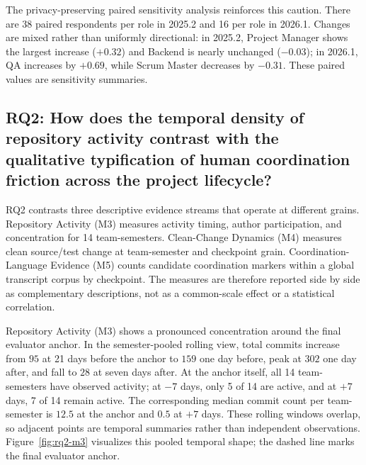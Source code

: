 The privacy-preserving paired sensitivity analysis reinforces this caution.
There are 38 paired respondents per role in 2025.2 and 16 per role in 2026.1.
Changes are mixed rather than uniformly directional: in 2025.2, Project
Manager shows the largest increase ($+0.32$) and Backend is nearly unchanged
($-0.03$); in 2026.1, QA increases by $+0.69$, while Scrum Master decreases
by $-0.31$. These paired values are sensitivity summaries.

\subsection{RQ2: How does the temporal density of repository activity contrast with the qualitative typification of human coordination friction across the project lifecycle?}

RQ2 contrasts three descriptive evidence streams that operate at different
grains. Repository Activity (M3) measures activity timing, author participation,
and concentration for 14 team-semesters. Clean-Change Dynamics (M4) measures
clean source/test change at team-semester and checkpoint grain.
Coordination-Language Evidence (M5) counts candidate coordination markers
within a global transcript corpus by checkpoint. The measures are therefore
reported side by side as complementary descriptions, not as a common-scale
effect or a statistical correlation.

Repository Activity (M3) shows a pronounced concentration around the final
evaluator anchor. In the semester-pooled rolling view, total commits increase
from $95$ at 21 days before the anchor to $159$ one day before, peak at $302$
one day after, and fall to $28$ at seven days after. At the anchor itself,
all 14 team-semesters have observed activity; at $-7$ days, only 5 of 14 are
active, and at $+7$ days, 7 of 14 remain active. The corresponding median
commit count per team-semester is $12.5$ at the anchor and $0.5$ at $+7$ days.
These rolling windows overlap, so adjacent points are temporal summaries rather
than independent observations.
Figure~\ref{fig:rq2-m3} visualizes this pooled temporal shape; the dashed line
marks the final evaluator anchor.

